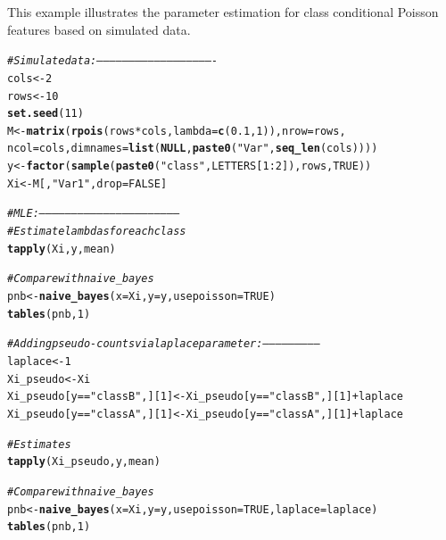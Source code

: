 \documentclass{article}\usepackage[]{graphicx}\usepackage[]{xcolor}
\makeatletter
\newcommand{\hlnum}[1]{\textcolor[rgb]{0.686,0.059,0.569}{#1}}%
\newcommand{\hlstr}[1]{\textcolor[rgb]{0.192,0.494,0.8}{#1}}%
\newcommand{\hlcom}[1]{\textcolor[rgb]{0.678,0.584,0.686}{\textit{#1}}}%
\newcommand{\hlopt}[1]{\textcolor[rgb]{0,0,0}{#1}}%
\newcommand{\hlstd}[1]{\textcolor[rgb]{0.345,0.345,0.345}{#1}}%
\newcommand{\hlkwa}[1]{\textcolor[rgb]{0.161,0.373,0.58}{\textbf{#1}}}%
\newcommand{\hlkwb}[1]{\textcolor[rgb]{0.69,0.353,0.396}{#1}}%
\newcommand{\hlkwc}[1]{\textcolor[rgb]{0.333,0.667,0.333}{#1}}%
\newcommand{\hlkwd}[1]{\textcolor[rgb]{0.737,0.353,0.396}{\textbf{#1}}}%
\newenvironment{kframe}{%
 \def\at@end@of@kframe{}%
 \ifinner\ifhmode%
  \def\at@end@of@kframe{\end{minipage}}%
  \begin{minipage}{\columnwidth}%
 \fi\fi%
 \def\FrameCommand##1{\hskip\@totalleftmargin \hskip-\fboxsep
 \colorbox{shadecolor}{##1}\hskip-\fboxsep
     \hskip-\linewidth \hskip-\@totalleftmargin \hskip\columnwidth}%
 \MakeFramed {\advance\hsize-\width
   \@totalleftmargin\z@ \linewidth\hsize
   \@setminipage}}%
 {\par\unskip\endMakeFramed%
 \at@end@of@kframe}
\newenvironment{knitrout}{}{} %
\makeatother
\begin{document}
This example illustrates the parameter estimation for class conditional Poisson features based on simulated data.

\begin{knitrout}
\color{fgcolor}\begin{kframe}
\begin{alltt}
\hlcom{# Simulate data: -------------------------------------------------------}
\hlstd{cols} \hlkwb{<-} \hlnum{2}
\hlstd{rows} \hlkwb{<-} \hlnum{10}
\hlkwd{set.seed}\hlstd{(}\hlnum{11}\hlstd{)}
\hlstd{M} \hlkwb{<-} \hlkwd{matrix}\hlstd{(}\hlkwd{rpois}\hlstd{(rows} \hlopt{*} \hlstd{cols,} \hlkwc{lambda} \hlstd{=} \hlkwd{c}\hlstd{(}\hlnum{0.1}\hlstd{,}\hlnum{1}\hlstd{)),} \hlkwc{nrow} \hlstd{= rows,}
            \hlkwc{ncol} \hlstd{= cols,} \hlkwc{dimnames} \hlstd{=} \hlkwd{list}\hlstd{(}\hlkwa{NULL}\hlstd{,} \hlkwd{paste0}\hlstd{(}\hlstr{"Var"}\hlstd{,} \hlkwd{seq_len}\hlstd{(cols))))}
\hlstd{y} \hlkwb{<-} \hlkwd{factor}\hlstd{(}\hlkwd{sample}\hlstd{(}\hlkwd{paste0}\hlstd{(}\hlstr{"class"}\hlstd{, LETTERS[}\hlnum{1}\hlopt{:}\hlnum{2}\hlstd{]), rows,} \hlnum{TRUE}\hlstd{))}
\hlstd{Xi} \hlkwb{<-} \hlstd{M[ ,}\hlstr{"Var1"}\hlstd{,} \hlkwc{drop} \hlstd{=} \hlnum{FALSE}\hlstd{]}

\hlcom{# MLE: -----------------------------------------------------------------}
\hlcom{# Estimate lambdas for each class}
\hlkwd{tapply}\hlstd{(Xi, y, mean)}

\hlcom{# Compare with naive_bayes}
\hlstd{pnb} \hlkwb{<-} \hlkwd{naive_bayes}\hlstd{(}\hlkwc{x} \hlstd{= Xi,} \hlkwc{y} \hlstd{= y,} \hlkwc{usepoisson} \hlstd{=} \hlnum{TRUE}\hlstd{)}
\hlkwd{tables}\hlstd{(pnb,} \hlnum{1}\hlstd{)}

\hlcom{# Adding pseudo-counts via laplace parameter: --------------------------}
\hlstd{laplace} \hlkwb{<-} \hlnum{1}
\hlstd{Xi_pseudo} \hlkwb{<-} \hlstd{Xi}
\hlstd{Xi_pseudo[y} \hlopt{==} \hlstr{"classB"}\hlstd{,][}\hlnum{1}\hlstd{]} \hlkwb{<-} \hlstd{Xi_pseudo[y} \hlopt{==} \hlstr{"classB"}\hlstd{,][}\hlnum{1}\hlstd{]} \hlopt{+} \hlstd{laplace}
\hlstd{Xi_pseudo[y} \hlopt{==} \hlstr{"classA"}\hlstd{,][}\hlnum{1}\hlstd{]} \hlkwb{<-} \hlstd{Xi_pseudo[y} \hlopt{==} \hlstr{"classA"}\hlstd{,][}\hlnum{1}\hlstd{]} \hlopt{+} \hlstd{laplace}

\hlcom{# Estimates}
\hlkwd{tapply}\hlstd{(Xi_pseudo, y, mean)}

\hlcom{# Compare with naive_bayes}
\hlstd{pnb} \hlkwb{<-} \hlkwd{naive_bayes}\hlstd{(}\hlkwc{x} \hlstd{= Xi,} \hlkwc{y} \hlstd{= y,} \hlkwc{usepoisson} \hlstd{=} \hlnum{TRUE}\hlstd{,} \hlkwc{laplace} \hlstd{= laplace)}
\hlkwd{tables}\hlstd{(pnb,} \hlnum{1}\hlstd{)}
\end{alltt}
\end{kframe}
\end{knitrout}
\end{document}
